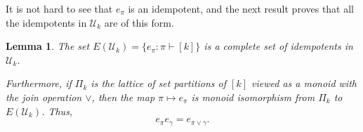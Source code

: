 \documentclass[10pt]{amsart}
\newtheorem{lemma}[theorem]{Lemma}
\theoremstyle{definition}
\theoremstyle{remark}
\begin{document}
It is not hard to see that $e_\pi$ is an idempotent, and the
next result proves that all the idempotents in $\mathcal{U}_k$
are of this form.

\begin{lemma} \label{lem:idempotents}
The set $E(\mathcal{U}_k) = \{e_\pi : \pi \vdash [k] \}$ is a complete set of idempotents in $\mathcal{U}_k$.

Furthermore, if $\Pi_k$ is the lattice of set partitions of $[k]$ viewed as a monoid with the join operation $\vee$,
then the map $\pi \mapsto e_\pi$ is monoid isomorphism from $\Pi_k$ to $E(\mathcal{U}_k)$. Thus,
\begin{equation*}
    e_\pi e_\gamma = e_{\pi \vee \gamma}.
\end{equation*}
\end{lemma}
\end{document}
